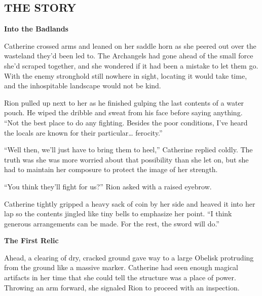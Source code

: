 \begin{multicols}{2}
\end{multicols}


\newpage

\begin{multicols*}{2}

\subsection*{\MakeUppercase{The story}}

\textbf{Into the Badlands}

Catherine crossed arms and leaned on her saddle horn as she peered out over the wasteland they'd been led to.
The Archangels had gone ahead of the small force she'd scraped together, and she wondered if it had been a mistake to let them go.
With the enemy stronghold still nowhere in sight, locating it would take time, and the inhospitable landscape would not be kind.

Rion pulled up next to her as he finished gulping the last contents of a water pouch.
He wiped the dribble and sweat from his face before saying anything.
``Not the best place to do any fighting.
Besides the poor conditions, I've heard the locals are known for their particular… ferocity.''

``Well then, we'll just have to bring them to heel,'' Catherine replied coldly.
The truth was she was more worried about that possibility than she let on, but she had to maintain her composure to protect the image of her strength.

``You think they'll fight for us?'' Rion asked with a raised eyebrow.

Catherine tightly gripped a heavy sack of coin by her side and heaved it into her lap so the contents jingled like tiny bells to emphasize her point.
``I think generous arrangements can be made.
For the rest, the sword will do.''

\textbf{The First Relic}

Ahead, a clearing of dry, cracked ground gave way to a large Obelisk protruding from the ground like a massive marker.
Catherine had seen enough magical artifacts in her time that she could tell the structure was a place of power.
Throwing an arm forward, she signaled Rion to proceed with an inspection.


\end{multicols*}
